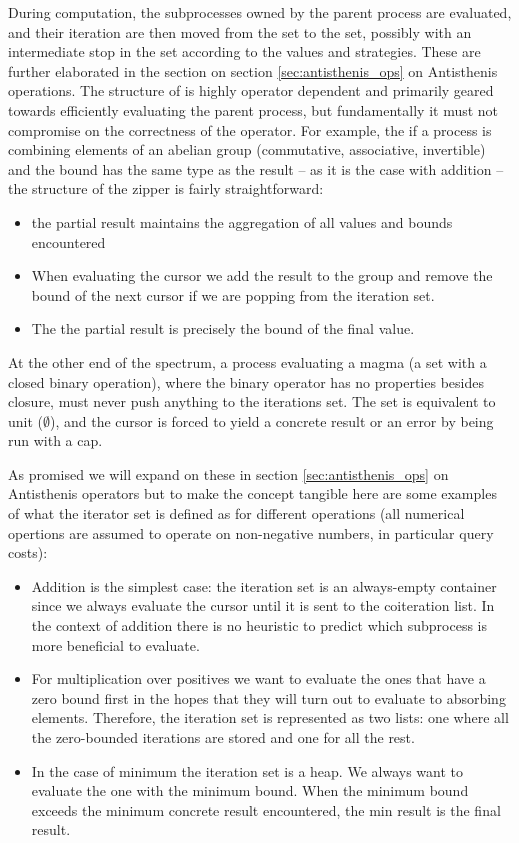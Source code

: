 During computation, the subprocesses owned by the parent process are
evaluated, and their iteration are then moved from the 
set to the  set, possibly with an intermediate stop
in the  set according to the values and
strategies. These are further elaborated in the section on section
\ref{sec:antisthenis_ops} on Antisthenis operations. The structure of
 is highly operator dependent and primarily geared
towards efficiently evaluating the parent process, but fundamentally
it must not compromise on the correctness of the operator. For
example, the if a process is combining elements of an abelian group
(commutative, associative, invertible) and the bound has the same type
as the result -- as it is the case with addition -- the structure of
the zipper is fairly straightforward:

\begin{itemize}
\item the partial result maintains the aggregation of all values and
  bounds encountered
\item When evaluating the cursor we add the result to the group and
  remove the bound of the next cursor if we are popping from the
  iteration set.
\item The the partial result is precisely the bound of the final
  value.
\end{itemize}



At the other end of the spectrum, a process evaluating a magma (a set
with a closed binary operation), where the binary operator has no
properties besides closure, must never push anything to the iterations
set. The set is equivalent to unit (\(\emptyset\)), and the cursor is
forced to yield a concrete result or an error by being run with a
 cap.

As promised we will expand on these in section
\ref{sec:antisthenis_ops} on Antisthenis operators but to make the
concept tangible here are some examples of what the iterator set is
defined as for different operations (all numerical opertions are
assumed to operate on non-negative numbers, in particular query
costs):

\begin{itemize}
\item Addition is the simplest case: the iteration set is an
  always-empty container since we always evaluate the cursor until it
  is sent to the coiteration list. In the context of addition there is
  no heuristic to predict which subprocess is more beneficial to
  evaluate.
\item For multiplication over positives we want to evaluate the ones
  that have a zero bound first in the hopes that they will turn out to
  evaluate to absorbing elements. Therefore, the iteration set is
  represented as two lists: one where all the zero-bounded iterations
  are stored and one for all the rest.
\item In the case of minimum the iteration set is a heap. We always
  want to evaluate the one with the minimum bound. When the minimum
  bound exceeds the minimum concrete result encountered, the min
  result is the final result.
\end{itemize}

